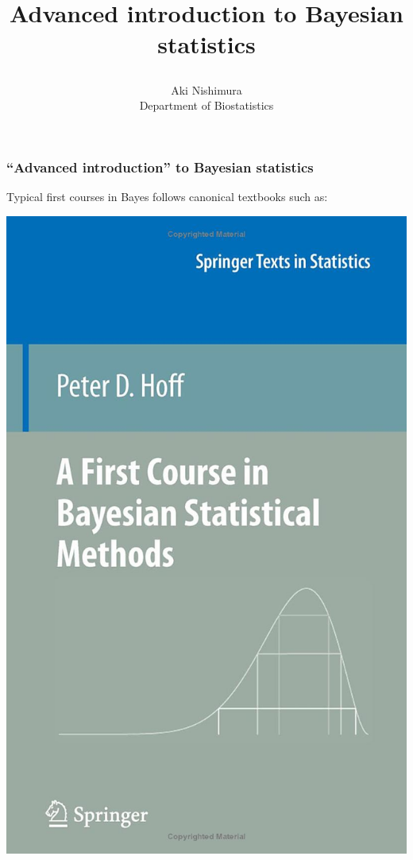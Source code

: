 \documentclass[18pt]{beamer}
\title{\centerline{Advanced introduction to Bayesian statistics}}
\author{%
	Aki Nishimura\\
	Department of Biostatistics%
}
\date{}
\begin{document}
\maketitle


\begin{frame}
\frametitle{``Advanced introduction'' to Bayesian statistics}
\pause
Typical first courses in Bayes follows canonical textbooks such as:
\smallskip

\begin{minipage}{.48\textwidth}
\centering
\includegraphics[height=.65\paperheight]{Figure/hoff_first_bayes_course}
\end{minipage}
~
\begin{minipage}{.48\textwidth}

\end{minipage}
\end{frame}
\end{document}
